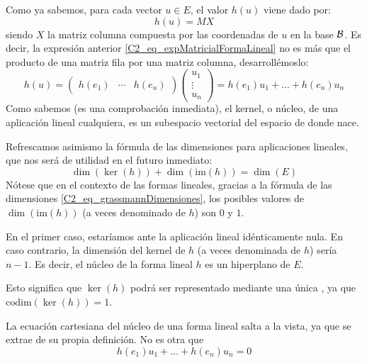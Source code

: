Como ya sabemos, para cada vector $u\in E$, el valor $h(u)$ viene dado por:
\begin{equation}
	\label{C2_eq_expMatricialFormaLineal}
	h(u)=MX	
\end{equation}
siendo $X$ la matriz columna compuesta por las coordenadas de $u$ en la base $\mathcal{B}$. Es decir, la expresión anterior \eqref{C2_eq_expMatricialFormaLineal} no es más que el producto de una matriz fila por una matriz columna, desarrollémoslo:
\begin{equation}
	\label{C2_eq_expMatricialFormaLinealExpandida}
	h(u)=\begin{pmatrix}
	h(e_1) & \cdots & h(e_n)
	\end{pmatrix}\begin{pmatrix}
	u_1\\
	\vdots\\
	u_n
	\end{pmatrix}=h(e_1)u_1+\dots+h(e_n)u_n
\end{equation}
Como sabemos (es una comprobación inmediata), el kernel, o núcleo, de una aplicación lineal cualquiera, es un subespacio vectorial del espacio de donde nace.

Refrescamos asimismo la fórmula de las dimensiones para aplicaciones lineales, que nos será de utilidad en el futuro inmediato:
\begin{equation}
	\label{C2_eq_grassmannDimensiones}
	\dim(\ker(h))+\dim(\mathrm{im}(h))=\dim(E)
\end{equation}
Nótese que en el contexto de las formas lineales, gracias a la fórmula de las dimensiones \eqref{C2_eq_grassmannDimensiones}, los posibles valores de $\dim(\mathrm{im}(h))$ (a veces denominado  de $h$) son $0$ y $1$. 

En el primer caso, estaríamos ante la aplicación lineal idénticamente nula. En caso contrario, la dimensión del kernel de $h$ (a veces denominada  de $h$) sería $n-1$. Es decir, el núcleo de la forma lineal $h$ es un hiperplano de $E$.

Esto significa que $\ker(h)$ podrá ser representado mediante una única , ya que $\mathrm{codim}(\ker(h))=1$.

La ecuación cartesiana del núcleo de una forma lineal salta a la vista, ya que se extrae de su propia definición. No es otra que
\begin{equation}
	\label{C2_eq_ecuacionCartesianaKer}
	h(e_1)u_1+\dots+h(e_n)u_n=0
\end{equation}

